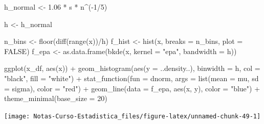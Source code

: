 \documentclass[
  12pt,
]{book}
\newenvironment{Shaded}{\begin{snugshade}}{\end{snugshade}}
\newcommand{\AttributeTok}[1]{\textcolor[rgb]{0.77,0.63,0.00}{#1}}
\newcommand{\ConstantTok}[1]{\textcolor[rgb]{0.00,0.00,0.00}{#1}}
\newcommand{\DecValTok}[1]{\textcolor[rgb]{0.00,0.00,0.81}{#1}}
\newcommand{\FloatTok}[1]{\textcolor[rgb]{0.00,0.00,0.81}{#1}}
\newcommand{\FunctionTok}[1]{\textcolor[rgb]{0.00,0.00,0.00}{#1}}
\newcommand{\NormalTok}[1]{#1}
\newcommand{\OtherTok}[1]{\textcolor[rgb]{0.56,0.35,0.01}{#1}}
\newcommand{\SpecialCharTok}[1]{\textcolor[rgb]{0.00,0.00,0.00}{#1}}
\newcommand{\StringTok}[1]{\textcolor[rgb]{0.31,0.60,0.02}{#1}}
\theoremstyle{definition}
\theoremstyle{definition}
\theoremstyle{definition}
\theoremstyle{remark}
\begin{document}
\begin{Shaded}
\begin{Highlighting}[]
\NormalTok{h\_normal }\OtherTok{\textless{}{-}} \FloatTok{1.06} \SpecialCharTok{*}\NormalTok{ s }\SpecialCharTok{*}\NormalTok{ n}\SpecialCharTok{\^{}}\NormalTok{(}\SpecialCharTok{{-}}\DecValTok{1}\SpecialCharTok{/}\DecValTok{5}\NormalTok{)}

\NormalTok{h }\OtherTok{\textless{}{-}}\NormalTok{ h\_normal}

\NormalTok{n\_bins }\OtherTok{\textless{}{-}} \FunctionTok{floor}\NormalTok{(}\FunctionTok{diff}\NormalTok{(}\FunctionTok{range}\NormalTok{(x))}\SpecialCharTok{/}\NormalTok{h)}
\NormalTok{f\_hist }\OtherTok{\textless{}{-}} \FunctionTok{hist}\NormalTok{(x, }\AttributeTok{breaks =}\NormalTok{ n\_bins, }\AttributeTok{plot =} \ConstantTok{FALSE}\NormalTok{)}
\NormalTok{f\_epa }\OtherTok{\textless{}{-}} \FunctionTok{as.data.frame}\NormalTok{(}\FunctionTok{bkde}\NormalTok{(x, }\AttributeTok{kernel =} \StringTok{"epa"}\NormalTok{, }\AttributeTok{bandwidth =}\NormalTok{ h))}

\FunctionTok{ggplot}\NormalTok{(x\_df, }\FunctionTok{aes}\NormalTok{(x)) }\SpecialCharTok{+} \FunctionTok{geom\_histogram}\NormalTok{(}\FunctionTok{aes}\NormalTok{(}\AttributeTok{y =}\NormalTok{ ..density..), }
    \AttributeTok{binwidth =}\NormalTok{ h, }\AttributeTok{col =} \StringTok{"black"}\NormalTok{, }\AttributeTok{fill =} \StringTok{"white"}\NormalTok{) }\SpecialCharTok{+} 
    \FunctionTok{stat\_function}\NormalTok{(}\AttributeTok{fun =}\NormalTok{ dnorm, }\AttributeTok{args =} \FunctionTok{list}\NormalTok{(}\AttributeTok{mean =}\NormalTok{ mu, }
        \AttributeTok{sd =}\NormalTok{ sigma), }\AttributeTok{color =} \StringTok{"red"}\NormalTok{) }\SpecialCharTok{+} \FunctionTok{geom\_line}\NormalTok{(}\AttributeTok{data =}\NormalTok{ f\_epa, }
    \FunctionTok{aes}\NormalTok{(x, y), }\AttributeTok{color =} \StringTok{"blue"}\NormalTok{) }\SpecialCharTok{+} \FunctionTok{theme\_minimal}\NormalTok{(}\AttributeTok{base\_size =} \DecValTok{20}\NormalTok{)}
\end{Highlighting}
\end{Shaded}

\begin{center}\texttt{[image: Notas-Curso-Estadistica\_files/figure-latex/unnamed-chunk-49-1]} \end{center}
\end{document}
